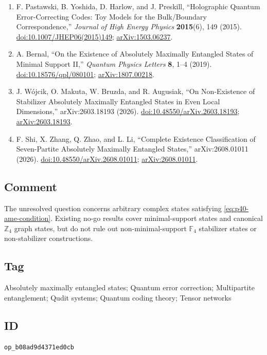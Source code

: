 \begin{enumerate}[label={},leftmargin=4.8em,labelsep=0.5em]
  \footnotesize
  \item[\textup{[PYHP15]}]\label{ref:p40-pastawski}
  F. Pastawski, B. Yoshida, D. Harlow, and J. Preskill,
  ``Holographic Quantum Error-Correcting Codes: Toy Models for the
  Bulk/Boundary Correspondence,'' \emph{Journal of High Energy Physics}
  \textbf{2015}(6), 149 (2015).
  \href{https://doi.org/10.1007/JHEP06(2015)149}%
       {doi:10.1007/JHEP06(2015)149};
  \href{https://arxiv.org/abs/1503.06237}{arXiv:1503.06237}.

  \item[\textup{[Ber19]}]\label{ref:p40-bernal}
  A. Bernal,
  ``On the Existence of Absolutely Maximally Entangled States of Minimal
  Support II,'' \emph{Quantum Physics Letters} \textbf{8}, 1--4 (2019).
  \href{https://doi.org/10.18576/qpl/080101}{doi:10.18576/qpl/080101};
  \href{https://arxiv.org/abs/1807.00218}{arXiv:1807.00218}.

  \item[\textup{[WMB+26]}]\label{ref:p40-wojcik}
  J. W\'ojcik, O. Makuta, W. Bruzda, and R. Augusiak,
  ``On Non-Existence of Stabilizer Absolutely Maximally Entangled States in
  Even Local Dimensions,'' arXiv:2603.18193 (2026).
  \href{https://doi.org/10.48550/arXiv.2603.18193}%
       {doi:10.48550/arXiv.2603.18193};
  \href{https://arxiv.org/abs/2603.18193}{arXiv:2603.18193}.

  \item[\textup{[SZZL26]}]\label{ref:p40-shi}
  F. Shi, X. Zhang, Q. Zhao, and L. Li,
  ``Complete Existence Classification of Seven-Partite Absolutely Maximally
  Entangled States,'' arXiv:2608.01011 (2026).
  \href{https://doi.org/10.48550/arXiv.2608.01011}%
       {doi:10.48550/arXiv.2608.01011};
  \href{https://arxiv.org/abs/2608.01011}{arXiv:2608.01011}.
\end{enumerate}

\subsection*{Comment}

The unresolved question concerns arbitrary complex states satisfying
\eqref{eq:p40-ame-condition}.  Existing no-go results cover minimal-support
states and canonical $\mathbb{Z}_{4}$ graph states, but do not rule out
non-minimal-support $\mathbb{F}_{4}$ stabilizer states or non-stabilizer
constructions.

\subsection*{Tag}

Absolutely maximally entangled states; Quantum error correction; Multipartite
entanglement; Qudit systems; Quantum coding theory; Tensor networks

\subsection*{ID}

\texttt{op\_b08ad9d4371ed0cb}
